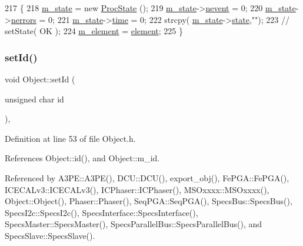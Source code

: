 \begin{DoxyCode}
217                                      \{
218     \hyperlink{classProcessus_ab3539eee42891ceae0baf4395ae7fb61}{m\_state} = \textcolor{keyword}{new} \hyperlink{structProcState}{ProcState} ();
219     \hyperlink{classProcessus_ab3539eee42891ceae0baf4395ae7fb61}{m\_state}->\hyperlink{structProcState_a1881d6b0db849a8af15f586ad5959260}{nevent}  = 0;
220     \hyperlink{classProcessus_ab3539eee42891ceae0baf4395ae7fb61}{m\_state}->\hyperlink{structProcState_a51a0f54ba62b07e07ac8518c5f32828d}{nerrors} = 0;
221     \hyperlink{classProcessus_ab3539eee42891ceae0baf4395ae7fb61}{m\_state}->\hyperlink{structProcState_a88c69b099d8f2b2164d478f28e87610f}{time}    = 0;
222     strcpy( \hyperlink{classProcessus_ab3539eee42891ceae0baf4395ae7fb61}{m\_state}->\hyperlink{structProcState_aaffb70e5af437e2c0d4dfc69bd0b24cd}{state},\textcolor{stringliteral}{""});
223     \textcolor{comment}{//  setState( OK );}
224     \hyperlink{classProcessus_aa9d24d53c3e52f36786cabb5d8e296e7}{m\_element} = \hyperlink{classProcessus_a6fe155527431a7190b7d44d600b9608d}{element};
225   \}
\end{DoxyCode}
\mbox{\label{classObject_a398fe08cba594a0ce6891d59fe4f159f}} 
\subsubsection{\texorpdfstring{set\+Id()}{setId()}}
{\footnotesize\ttfamily void Object\+::set\+Id (\begin{DoxyParamCaption}\item[{unsigned char}]{id }\end{DoxyParamCaption})\hspace{0.3cm}{\ttfamily [inline]}, {\ttfamily [inherited]}}



Definition at line 53 of file Object.\+h.



References Object\+::id(), and Object\+::m\+\_\+id.



Referenced by A3\+P\+E\+::\+A3\+P\+E(), D\+C\+U\+::\+D\+C\+U(), export\+\_\+obj(), Fe\+P\+G\+A\+::\+Fe\+P\+G\+A(), I\+C\+E\+C\+A\+Lv3\+::\+I\+C\+E\+C\+A\+Lv3(), I\+C\+Phaser\+::\+I\+C\+Phaser(), M\+S\+Oxxxx\+::\+M\+S\+Oxxxx(), Object\+::\+Object(), Phaser\+::\+Phaser(), Seq\+P\+G\+A\+::\+Seq\+P\+G\+A(), Specs\+Bus\+::\+Specs\+Bus(), Specs\+I2c\+::\+Specs\+I2c(), Specs\+Interface\+::\+Specs\+Interface(), Specs\+Master\+::\+Specs\+Master(), Specs\+Parallel\+Bus\+::\+Specs\+Parallel\+Bus(), and Specs\+Slave\+::\+Specs\+Slave().



